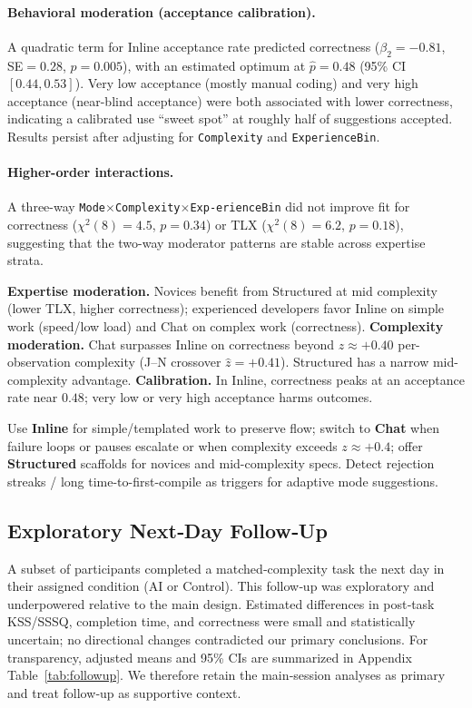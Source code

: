 \documentclass[sigconf]{acmart}
\begin{document}
\paragraph{Behavioral moderation (acceptance calibration).}
A quadratic term for Inline acceptance rate predicted correctness ($\beta_2{=}{-}0.81$, SE$=0.28$, $p{=}0.005$), with an estimated optimum at $\hat{p}{=}0.48$ (95\% CI $[0.44, 0.53]$). Very low acceptance (mostly manual coding) and very high acceptance (near-blind acceptance) were both associated with lower correctness, indicating a calibrated use “sweet spot” at roughly half of suggestions accepted. Results persist after adjusting for \texttt{Complexity} and \texttt{ExperienceBin}.

\paragraph{Higher-order interactions.}
A three-way \texttt{Mode$\times$Complexity$\times$Exp-\allowbreak{}erienceBin} did not improve fit for correctness ($\chi^2(8){=}4.5$, $p{=}0.34$) or TLX ($\chi^2(8){=}6.2$, $p{=}0.18$), suggesting that the two-way moderator patterns are stable across expertise strata.

\textbf{Expertise moderation.} Novices benefit from Structured at mid complexity (lower TLX, higher correctness); experienced developers favor Inline on simple work (speed/low load) and Chat on complex work (correctness). \textbf{Complexity moderation.} Chat surpasses Inline on correctness beyond \(z{\approx}{+}0.40\) per-observation complexity (J--N crossover \(\hat{z}{=}+0.41\)). Structured has a narrow mid-complexity advantage. 
\textbf{Calibration.} In Inline, correctness peaks at an acceptance rate near \(0.48\); very low or very high acceptance harms outcomes.

Use \textbf{Inline} for simple/templated work to preserve flow; switch to \textbf{Chat} when failure loops or pauses escalate or when complexity exceeds \(z{\approx}{+}0.4\); offer \textbf{Structured} scaffolds for novices and mid-complexity specs. Detect rejection streaks / long time-to-first-compile as triggers for adaptive mode suggestions.

\subsection{Exploratory Next‑Day Follow‑Up}
\label{sec:followup}

A subset of participants completed a matched‑complexity task the next day in their assigned condition (AI or Control). This follow‑up was exploratory and underpowered relative to the main design. Estimated differences in post‑task KSS/SSSQ, completion time, and correctness were small and statistically uncertain; no directional changes contradicted our primary conclusions. For transparency, adjusted means and 95\% CIs are summarized in Appendix Table~\ref{tab:followup}. We therefore retain the main‑session analyses as primary and treat follow‑up as supportive context.
\end{document}
